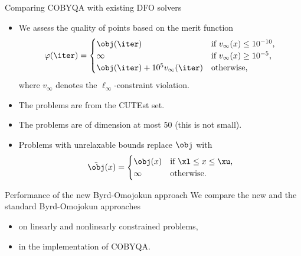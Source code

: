 \documentclass[optimization]{common/talk}
\newcommand{\drawprofiles}[3]{%
    \def\selectsolvers{#1}%
    \def\selectcsv{figures/#2}%
    \def\selectprofile{#3}%
    \def\selectxlabel{Performance ratios}%
    \def\selectylabel{Performance profiles ($\tau = 10^{-#3}$)}%
}
\begin{document}
\begin{frame}{Comparing COBYQA with existing DFO solvers}
    \begin{itemize}
        \item We assess the quality of points based on the merit function
        \begin{equation*}
            \varphi(\iter) =
            \begin{cases}
                \obj(\iter)                           & \text{if $v_{\infty}(x) \le 10^{-10}$,}\\
                \infty                                & \text{if $v_{\infty}(x) \ge 10^{-5}$,}\\
                \obj(\iter) + 10^5 v_{\infty}(\iter)  & \text{otherwise,}
            \end{cases}
        \end{equation*}
        where $v_{\infty}$ denotes the $\ell_{\infty}$-constraint violation.
        \item The problems are from the \alert{CUTEst} set.
        \item The problems are of \alert{dimension} at most \num{50} (this is \alert{not} small).
        \item Problems with \alert{unrelaxable} bounds replace $\obj$ with
        \begin{equation*}
            \tilde{\obj}(x) =
            \begin{cases}
                \obj(x) & \text{if $\xl \le x \le \xu$,}\\
                \infty  & \text{otherwise.}
            \end{cases}
        \end{equation*}
    \end{itemize}
\end{frame}

\begin{frame}{Performance of the new Byrd-Omojokun approach}
    We compare the new and the standard Byrd-Omojokun approaches
    \begin{itemize}
        \item on \alert{linearly} and \alert{nonlinearly constrained} problems,
        \item in the implementation of COBYQA.
    \end{itemize}

    \smallskip

    \begin{center}
        \drawprofiles{{"New","Standard"}}{plain-1-50-perf-byrd-omojokun-nlqo.csv}{4}
    \end{center}
\end{frame}
\end{document}
